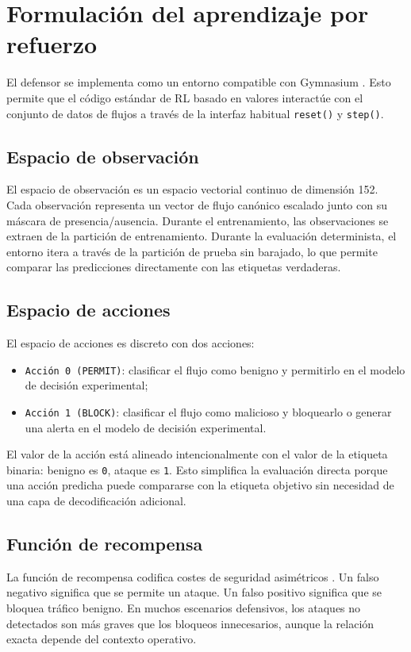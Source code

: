 \section{Formulación del aprendizaje por refuerzo}
El defensor se implementa como un entorno compatible con Gymnasium \parencite{GymnasiumDocs}. Esto permite que el código estándar de RL basado en valores interactúe con el conjunto de datos de flujos a través de la interfaz habitual \texttt{reset()} y \texttt{step()}.

\subsection{Espacio de observación}
El espacio de observación es un espacio vectorial continuo de dimensión 152. Cada observación representa un vector de flujo canónico escalado junto con su máscara de presencia/ausencia. Durante el entrenamiento, las observaciones se extraen de la partición de entrenamiento. Durante la evaluación determinista, el entorno itera a través de la partición de prueba sin barajado, lo que permite comparar las predicciones directamente con las etiquetas verdaderas.

\subsection{Espacio de acciones}
El espacio de acciones es discreto con dos acciones:
\begin{itemize}
    \item \texttt{Acción 0 (PERMIT)}: clasificar el flujo como benigno y permitirlo en el modelo de decisión experimental;
    \item \texttt{Acción 1 (BLOCK)}: clasificar el flujo como malicioso y bloquearlo o generar una alerta en el modelo de decisión experimental.
\end{itemize}

El valor de la acción está alineado intencionalmente con el valor de la etiqueta binaria: benigno es \texttt{0}, ataque es \texttt{1}. Esto simplifica la evaluación directa porque una acción predicha puede compararse con la etiqueta objetivo sin necesidad de una capa de decodificación adicional.

\subsection{Función de recompensa}
La función de recompensa codifica costes de seguridad asimétricos \parencite{Lee2002CostSensitiveIDS,Cardenas2006IDSFramework}. Un falso negativo significa que se permite un ataque. Un falso positivo significa que se bloquea tráfico benigno. En muchos escenarios defensivos, los ataques no detectados son más graves que los bloqueos innecesarios, aunque la relación exacta depende del contexto operativo.

